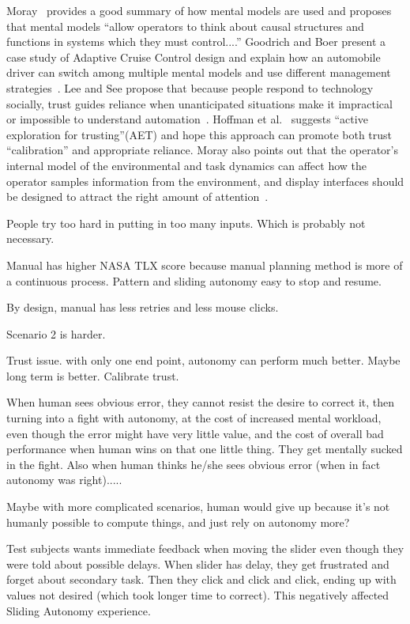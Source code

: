 \documentclass[journal]{IEEEtran}
\begin{document}
Moray~\cite{Moray1999Mental} provides a good summary of how mental models are used and proposes that mental models ``allow operators to think about causal structures and functions in systems which they must control....'' Goodrich and Boer present a case study of Adaptive Cruise Control design and explain how an automobile driver can switch among multiple mental models and use different management strategies~\cite{Goodrich2002Multiple, Goodrich2003Model}. Lee and See propose that because people respond to technology socially, trust guides reliance when unanticipated situations make it impractical or impossible to understand automation~\cite{Lee2004Trust}. Hoffman et al.\ \cite{Hoffman2013Trust} suggests ``active exploration for trusting''(AET) and hope this approach can promote both trust ``calibration'' and appropriate reliance. Moray also points out that the operator's internal model of the environmental and task dynamics can affect how the operator samples information from the environment, and display interfaces should be designed to attract the right amount of attention~\cite{Moray1990Designing}.

People try too hard in putting in too many inputs. Which is probably not necessary.

Manual has higher NASA TLX score because manual planning method is more of a continuous process. Pattern and sliding autonomy easy to stop and resume.

By design, manual has less retries and less mouse clicks.

Scenario 2 is harder.

Trust issue. with only one end point, autonomy can perform much better. Maybe long term is better. Calibrate trust.

When human sees obvious error, they cannot resist the desire to correct it, then turning into a fight with autonomy, at the cost of increased mental workload, even though the error might have very little value, and the cost of overall bad performance when human wins on that one little thing. They get mentally sucked in the fight. Also when human thinks he/she sees obvious error (when in fact autonomy was right).....

Maybe with more complicated scenarios, human would give up because it's not humanly possible to compute things, and just rely on autonomy more?

Test subjects wants immediate feedback when moving the slider even though they were told about possible delays. When slider has delay, they get frustrated and forget about secondary task. Then they click and click and click, ending up with values not desired (which took longer time to correct). This negatively affected Sliding Autonomy experience.
\end{document}

